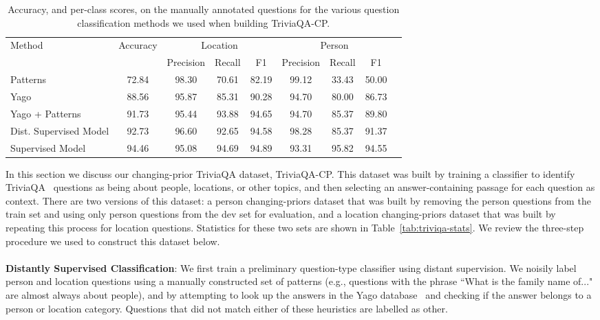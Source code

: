 \documentclass[11pt,a4paper]{article}
\begin{document}
\begin{table*}
    \centering
    \tablefont
\begin{tabular}{lcccccccc} \toprule
\multirow{2}{*}{Method} & \multirow{2}{*}{Accuracy} & \multicolumn{3}{c}{Location} & \multicolumn{3}{c}{Person}\\ 
\cmidrule(r){3-5} \cmidrule(l){6-8}
 & & Precision & Recall & F1 & Precision & Recall & F1\\ \midrule
Patterns & 72.84 & 98.30 & 70.61 & 82.19 & 99.12 & 33.43 & 50.00 \\ 
Yago & 88.56 & 95.87 & 85.31 & 90.28 & 94.70 & 80.00 & 86.73 \\ 
Yago + Patterns & 91.73 & 95.44 & 93.88 & 94.65 & 94.70 & 85.37 & 89.80 \\ 
Dist. Supervised Model & 92.73 & 96.60 & 92.65 & 94.58 & 98.28 & 85.37 & 91.37 \\ 
Supervised Model & 94.46 & 95.08 & 94.69 & 94.89 & 93.31 & 95.82 & 94.55 \\ 
\bottomrule
\end{tabular}
    \caption{Accuracy, and per-class scores, on the manually annotated questions for the various question classification methods we used when building TriviaQA-CP.}
    \label{tab:question-clf-results}
\end{table*}

In this section we discuss our changing-prior TriviaQA dataset, TriviaQA-CP. This dataset was built by training a classifier to identify TriviaQA~\cite{joshi2017triviaqa} questions as being about people, locations, or other topics, and then selecting an answer-containing passage for each question as context. There are two versions of this dataset: a person changing-priors dataset that was built by removing the person questions from the train set and using only person questions from the dev set for evaluation, and a location changing-priors dataset that was built by repeating this process for location questions. Statistics for these two sets are shown in Table~\ref{tab:triviqa-stats}. We review the three-step procedure we used to construct this dataset below.
\\
\\ 
\noindent \textbf{Distantly Supervised Classification}: We first train a preliminary question-type classifier using distant supervision. We noisily label person and location questions using a manually constructed set of patterns (e.g., questions with the phrase ``What is the family name of..." are almost always about people), and by attempting to look up the answers in the Yago database~\cite{suchanek2007yago} and checking if the answer belongs to a person or location category. Questions that did not match either of these heuristics are labelled as other.
\end{document}
